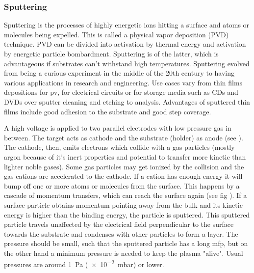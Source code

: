 \subsubsection{Sputtering}
Sputtering is the processes of highly energetic ions hitting a surface and atoms or molecules being expelled. 
This is called a physical vapor deposition (PVD) technique. 
PVD can be divided into activation by thermal energy and activation by energetic particle bombardment. 
Sputtering is of the latter, which 
is advantageous if substrates can't withstand high temperatures.
Sputtering evolved from being a curious experiment in the middle of the 20th century to having various applications in research and engineering.
Use cases vary from thin films depositions for \gls{pv}, for electrical circuits or for storage media such as CDs and DVDs 
over sputter cleaning and etching to analysis.
Advantages of 
sputtered thin films include good adhesion to the substrate and good step coverage\cite{Swann1988}.

A high voltage is applied to 
two parallel electrodes with low pressure gas in between. 
The target acts as cathode and the substrate (holder) as anode (see ).
The cathode, then, emits electrons which collide with a gas particles (mostly argon because of it's inert properties and potential to transfer more kinetic than lighter noble gases). 
Some gas particles may get ionized by the collision and the gas cations are accelerated to the cathode. 
If a cation has enough energy it will bump off one or more atoms or molecules from the surface. 
This happens by a cascade of momentum transfers, which can reach the surface again (see fig ). 
If a surface particle obtains momentum pointing away from the bulk and its kinetic energy is higher than the binding energy, the particle is sputtered. 
This sputtered particle travels unaffected by the electrical field perpendicular to the surface towards the substrate and condenses with other particles to form a layer.
The pressure should be small, such that the sputtered particle has a long \gls{mfp}, but on the other hand 
a minimum pressure is needed to keep the plasma "alive". 
Usual pressures are around \SI{1}{\Pa} (\num{e-2}\SI{}{\milli\bar}) or lower\cite{Swann1988}.

